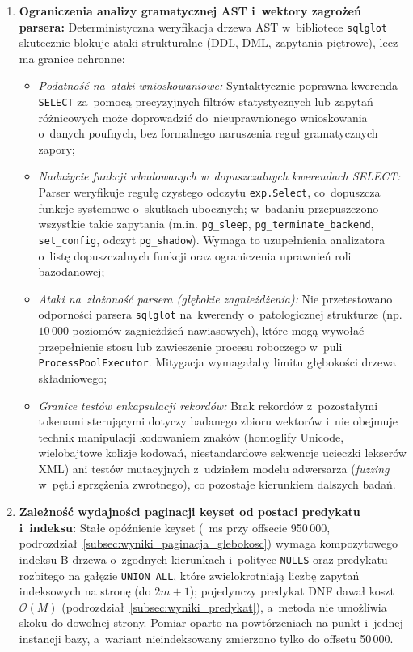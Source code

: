 \begin{enumerate}
    \item \textbf{Ograniczenia analizy gramatycznej AST i~wektory zagrożeń parsera:}
    Deterministyczna weryfikacja drzewa AST w~bibliotece \texttt{sqlglot} skutecznie blokuje ataki strukturalne (DDL, DML, zapytania piętrowe), lecz ma granice ochronne:
    \begin{itemize}
        \item \emph{Podatność na~ataki wnioskowaniowe:} Syntaktycznie poprawna kwerenda \texttt{SELECT} za~pomocą precyzyjnych filtrów statystycznych lub zapytań różnicowych może doprowadzić do~nieuprawnionego wnioskowania o~danych poufnych, bez formalnego naruszenia reguł gramatycznych zapory;
        \item \emph{Nadużycie funkcji wbudowanych w~dopuszczalnych kwerendach SELECT:} Parser weryfikuje regułę czystego odczytu \texttt{exp.Select}, co~dopuszcza funkcje systemowe o~skutkach ubocznych; w~badaniu przepuszczono wszystkie \wynSecSideEffect{} takie zapytania (m.in. \texttt{pg\_sleep}, \texttt{pg\_terminate\_backend}, \texttt{set\_config}, odczyt \texttt{pg\_shadow}). Wymaga to uzupełnienia analizatora o~listę dopuszczalnych funkcji oraz ograniczenia uprawnień roli bazodanowej;
        \item \emph{Ataki na~złożoność parsera (głębokie zagnieżdżenia):} Nie przetestowano odporności parsera \texttt{sqlglot} na~kwerendy o~patologicznej strukturze (np. $10\,000$ poziomów zagnieżdżeń nawiasowych), które mogą wywołać przepełnienie stosu lub zawieszenie procesu roboczego w~puli \texttt{ProcessPoolExecutor}. Mitygacja wymagałaby limitu głębokości drzewa składniowego;
        \item \emph{Granice testów enkapsulacji rekordów:} Brak rekordów z~pozostałymi tokenami sterującymi dotyczy badanego zbioru \wynSecPrompt{} wektorów i~nie obejmuje technik manipulacji kodowaniem znaków (homoglify Unicode, wielobajtowe kolizje kodowań, niestandardowe sekwencje ucieczki lekserów XML) ani testów mutacyjnych z~udziałem modelu adwersarza (\emph{fuzzing} w~pętli sprzężenia zwrotnego), co pozostaje kierunkiem dalszych badań.
    \end{itemize}

    \item \textbf{Zależność wydajności paginacji keyset od postaci predykatu i~indeksu:}
    Stałe opóźnienie keyset (\wynKeysetDeep~ms przy offsecie 950\,000, podrozdział~\ref{subsec:wyniki_paginacja_glebokosc}) wymaga kompozytowego indeksu B-drzewa o~zgodnych kierunkach i~polityce \texttt{NULLS} oraz predykatu rozbitego na gałęzie \texttt{UNION ALL}, które zwielokrotniają liczbę zapytań indeksowych na stronę (do $2m+1$); pojedynczy predykat DNF dawał koszt $\mathcal{O}(M)$ (podrozdział~\ref{subsec:wyniki_predykat}), a~metoda nie umożliwia skoku do dowolnej strony. Pomiar oparto na \wynPagReps{} powtórzeniach na punkt i~jednej instancji bazy, a~wariant nieindeksowany zmierzono tylko do offsetu 50\,000.
\end{enumerate}



